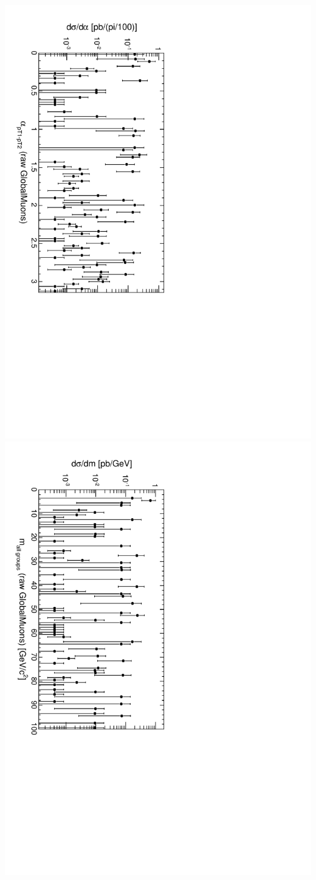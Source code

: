 \documentclass[compress]{beamer}
\begin{document}
\begin{frame}
\includegraphics[height=0.5\linewidth, angle=90]{openingbypt_PlainGlobalMuonAny.pdf}
\includegraphics[height=0.5\linewidth, angle=90]{mall_PlainGlobalMuonAny.pdf}
\end{frame}
\end{document}
